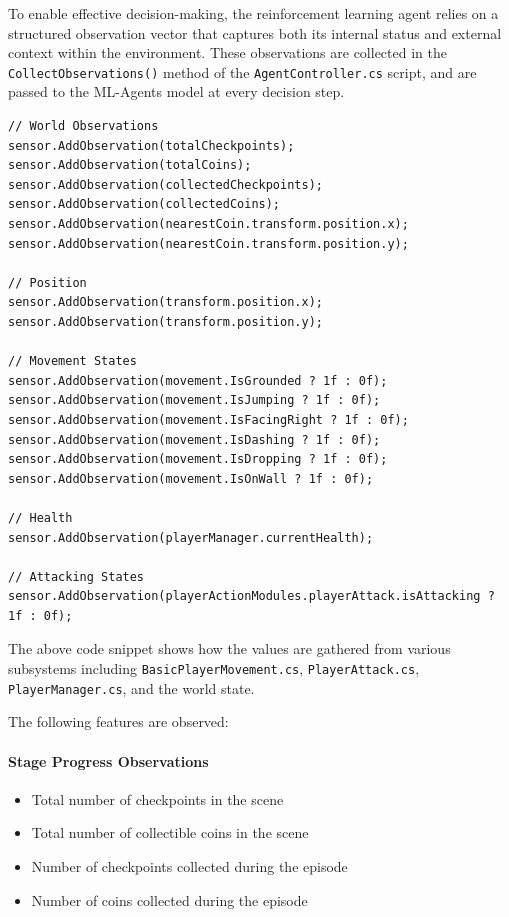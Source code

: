 \documentclass[12pt,oneside,openright,a4paper]{cpe-english-project}
\begin{document}
To enable effective decision-making, the reinforcement learning agent relies on a structured observation vector that captures both its internal status and external context within the environment. These observations are collected in the \texttt{CollectObservations()} method of the \texttt{AgentController.cs} script, and are passed to the ML-Agents model at every decision step.
\begin{lstlisting}[language={[Sharp]C}]
// World Observations
sensor.AddObservation(totalCheckpoints);
sensor.AddObservation(totalCoins);
sensor.AddObservation(collectedCheckpoints);
sensor.AddObservation(collectedCoins);
sensor.AddObservation(nearestCoin.transform.position.x);
sensor.AddObservation(nearestCoin.transform.position.y);

// Position
sensor.AddObservation(transform.position.x);
sensor.AddObservation(transform.position.y);

// Movement States
sensor.AddObservation(movement.IsGrounded ? 1f : 0f);
sensor.AddObservation(movement.IsJumping ? 1f : 0f);
sensor.AddObservation(movement.IsFacingRight ? 1f : 0f);
sensor.AddObservation(movement.IsDashing ? 1f : 0f);
sensor.AddObservation(movement.IsDropping ? 1f : 0f);
sensor.AddObservation(movement.IsOnWall ? 1f : 0f);

// Health
sensor.AddObservation(playerManager.currentHealth);

// Attacking States
sensor.AddObservation(playerActionModules.playerAttack.isAttacking ? 1f : 0f);
\end{lstlisting}
The above code snippet shows how the values are gathered from various subsystems including \texttt{BasicPlayerMovement.cs}, \texttt{PlayerAttack.cs}, \texttt{PlayerManager.cs}, and the world state.\par
The following features are observed:

\paragraph{Stage Progress Observations}
\begin{itemize}
\item Total number of checkpoints in the scene
\item Total number of collectible coins in the scene
\item Number of checkpoints collected during the episode
\item Number of coins collected during the episode
\end{itemize}
\end{document}
